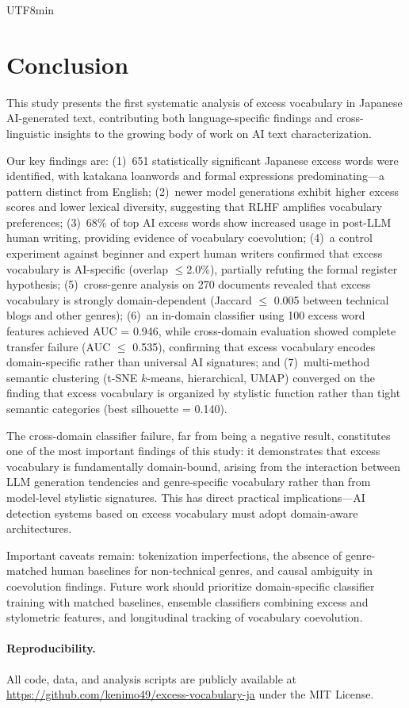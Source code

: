 \documentclass[11pt,a4paper]{article}
\begin{document}
\begin{CJK}{UTF8}{min}
\section{Conclusion}

This study presents the first systematic analysis of excess vocabulary in Japanese AI-generated text, contributing both language-specific findings and cross-linguistic insights to the growing body of work on AI text characterization.

Our key findings are: (1)~651 statistically significant Japanese excess words were identified, with katakana loanwords and formal expressions predominating---a pattern distinct from English; (2)~newer model generations exhibit higher excess scores and lower lexical diversity, suggesting that RLHF amplifies vocabulary preferences; (3)~68\% of top AI excess words show increased usage in post-LLM human writing, providing evidence of vocabulary coevolution; (4)~a control experiment against beginner and expert human writers confirmed that excess vocabulary is AI-specific (overlap $\leq$2.0\%), partially refuting the formal register hypothesis; (5)~cross-genre analysis on 270 documents revealed that excess vocabulary is strongly domain-dependent (Jaccard $\leq$ 0.005 between technical blogs and other genres); (6)~an in-domain classifier using 100 excess word features achieved AUC = 0.946, while cross-domain evaluation showed complete transfer failure (AUC $\leq$ 0.535), confirming that excess vocabulary encodes domain-specific rather than universal AI signatures; and (7)~multi-method semantic clustering (t-SNE $k$-means, hierarchical, UMAP) converged on the finding that excess vocabulary is organized by stylistic function rather than tight semantic categories (best silhouette = 0.140).

The cross-domain classifier failure, far from being a negative result, constitutes one of the most important findings of this study: it demonstrates that excess vocabulary is fundamentally domain-bound, arising from the interaction between LLM generation tendencies and genre-specific vocabulary rather than from model-level stylistic signatures. This has direct practical implications---AI detection systems based on excess vocabulary must adopt domain-aware architectures.

Important caveats remain: tokenization imperfections, the absence of genre-matched human baselines for non-technical genres, and causal ambiguity in coevolution findings. Future work should prioritize domain-specific classifier training with matched baselines, ensemble classifiers combining excess and stylometric features, and longitudinal tracking of vocabulary coevolution.

\paragraph{Reproducibility.} All code, data, and analysis scripts are publicly available at \url{https://github.com/kenimo49/excess-vocabulary-ja} under the MIT License.



\end{CJK}
\end{document}
